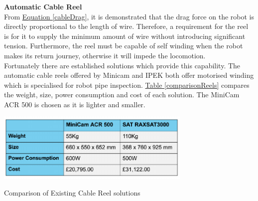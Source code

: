\documentclass[11pt]{article}		%
\newcommand{\equationref}[1]{\hyperref[#1]{Equation \ref*{#1}}}     %
\newcommand{\tableref}[1]{\hyperref[#1]{Table \ref*{#1}}}     %
\begin{document}
		    \textbf{Automatic Cable Reel}
	        \\
	        From \equationref{cableDrag}, it is demonstrated that the drag force on the robot is directly proportional to the length of wire. 
	        Therefore, a requirement for the reel is for it to supply the minimum amount of wire without introducing significant tension. 
	        Furthermore, the reel must be capable of self winding when the robot makes its return journey, otherwise it will impede the locomotion.
	        \\ 
	        \hspace*{2ex}Fortunately there are established solutions which provide this capability. 
	        The automatic cable reels offered by Minicam and IPEK both offer motorised winding which is specialised for robot pipe inspection. 
	        \tableref{comparisonReels} compares the weight, size, power consumption and cost of each solution. 
	        The MiniCam ACR 500 is chosen as it is lighter and smaller. 
	        \begin{table}[h]
				\centering
				\includegraphics[width=0.7\textwidth]{tablecables}
				\caption{Comparison of Existing Cable Reel solutions}
				\label{comparisonReels}
			\end{table}
\end{document}
